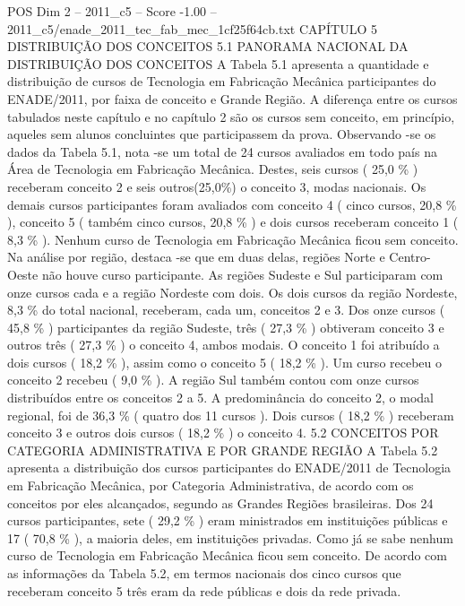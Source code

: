 \begin{textsample}{POS Dim 2 – 2011\_c5 – Score -1.00 – 2011\_c5/enade\_2011\_tec\_fab\_mec\_1cf25f64cb.txt}  \label{ex:f2_pos_350}
CAPÍTULO 5 DISTRIBUIÇÃO DOS CONCEITOS 5.1 PANORAMA NACIONAL DA DISTRIBUIÇÃO DOS CONCEITOS A Tabela 5.1 apresenta a quantidade e distribuição de cursos de Tecnologia em Fabricação Mecânica participantes do ENADE/2011, por faixa de conceito e Grande Região.
A diferença entre os cursos tabulados neste capítulo e no capítulo 2 são os cursos sem conceito, em princípio, aqueles sem alunos concluintes que participassem da prova.
Observando -se os dados da Tabela 5.1, nota -se um total de 24 cursos avaliados em todo país na Área de Tecnologia em Fabricação Mecânica.
Destes, seis cursos ( 25,0 \% ) receberam conceito 2 e seis outros(25,0\%) o conceito 3, modas nacionais.
Os demais cursos participantes foram avaliados com conceito 4 ( cinco cursos, 20,8 \% ), conceito 5 ( também cinco cursos, 20,8 \% ) e dois cursos receberam conceito 1 ( 8,3 \% ).
Nenhum curso de Tecnologia em Fabricação Mecânica ficou sem conceito.
Na análise por região, destaca -se que em duas delas, regiões Norte e Centro-Oeste não houve curso participante.
As regiões Sudeste e Sul participaram com onze cursos cada e a região Nordeste com dois.
Os dois cursos da região Nordeste, 8,3 \% do total nacional, receberam, cada um, conceitos 2 e 3.
Dos onze cursos ( 45,8 \% ) participantes da região Sudeste, três ( 27,3 \% ) obtiveram conceito 3 e outros três ( 27,3 \% ) o conceito 4, ambos modais.
O conceito 1 foi atribuído a dois cursos ( 18,2 \% ), assim como o conceito 5 ( 18,2 \% ).
Um curso recebeu o conceito 2 recebeu ( 9,0 \% ).
A região Sul também contou com onze cursos distribuídos entre os conceitos 2 a 5.
A predominância do conceito 2, o modal regional, foi de 36,3 \% ( quatro dos 11 cursos ).
Dois cursos ( 18,2 \% ) receberam conceito 3 e outros dois cursos ( 18,2 \% ) o conceito 4. 5.2 CONCEITOS POR CATEGORIA ADMINISTRATIVA E POR GRANDE REGIÃO A Tabela 5.2 apresenta a distribuição dos cursos participantes do ENADE/2011 de Tecnologia em Fabricação Mecânica, por Categoria Administrativa, de acordo com os conceitos por eles alcançados, segundo as Grandes Regiões brasileiras.
Dos 24 cursos participantes, sete ( 29,2 \% ) eram ministrados em instituições públicas e 17 ( 70,8 \% ), a maioria deles, em instituições privadas.
Como já se sabe nenhum curso de Tecnologia em Fabricação Mecânica ficou sem conceito.
De acordo com as informações da Tabela 5.2, em termos nacionais dos cinco cursos que receberam conceito 5 três eram da rede públicas e dois da rede privada.

\end{textsample}
